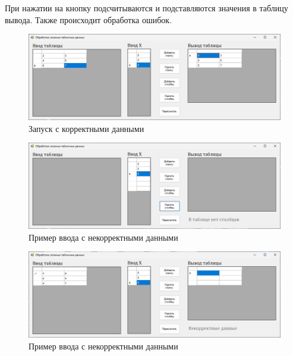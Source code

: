При нажатии на кнопку подсчитываются и подставляются значения в таблицу вывода. Также происходит обработка ошибок.

\begin{figure}
\centering
\includegraphics[width=0.5\linewidth]{images//handling-data-hard/okay.png}
\caption{Запуск с корректными данными}
\label{fig:handling-data-hard-okay}
\end{figure}

\begin{figure}
\centering
\includegraphics[width=0.5\linewidth]{images//handling-data-hard/error.png}
\caption{Пример ввода с некорректными данными}
\label{fig:handling-data-hard-error}
\end{figure}

\begin{figure}
\centering
\includegraphics[width=0.5\linewidth]{images//handling-data-hard/error2.png}
\caption{Пример ввода с некорректными данными}
\label{fig:handling-data-hard-error2}
\end{figure}

